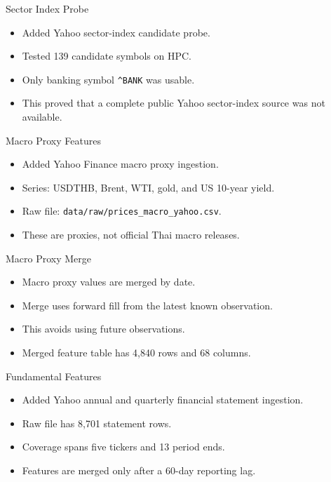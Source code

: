 \documentclass[aspectratio=43,10pt]{beamer}
\begin{document}
\begin{frame}{Sector Index Probe}
\begin{itemize}
  \item Added Yahoo sector-index candidate probe.
  \item Tested 139 candidate symbols on HPC.
  \item Only banking symbol \texttt{\^{}BANK} was usable.
  \item This proved that a complete public Yahoo sector-index source was not available.
\end{itemize}
\end{frame}

\begin{frame}{Macro Proxy Features}
\begin{itemize}
  \item Added Yahoo Finance macro proxy ingestion.
  \item Series: USDTHB, Brent, WTI, gold, and US 10-year yield.
  \item Raw file: \texttt{data/raw/prices\_macro\_yahoo.csv}.
  \item These are proxies, not official Thai macro releases.
\end{itemize}
\end{frame}

\begin{frame}{Macro Proxy Merge}
\begin{itemize}
  \item Macro proxy values are merged by date.
  \item Merge uses forward fill from the latest known observation.
  \item This avoids using future observations.
  \item Merged feature table has 4,840 rows and 68 columns.
\end{itemize}
\end{frame}

\begin{frame}{Fundamental Features}
\begin{itemize}
  \item Added Yahoo annual and quarterly financial statement ingestion.
  \item Raw file has 8,701 statement rows.
  \item Coverage spans five tickers and 13 period ends.
  \item Features are merged only after a 60-day reporting lag.
\end{itemize}
\end{frame}
\end{document}
